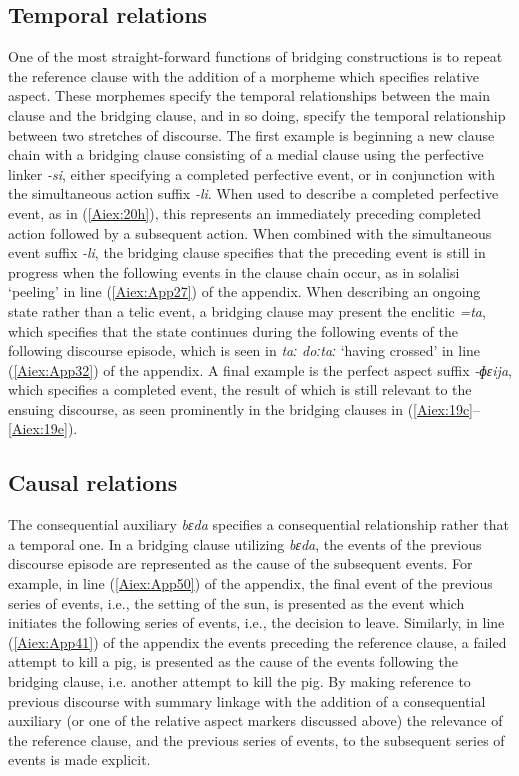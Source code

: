 \documentclass[output=paper]{LSP/langsci}
\begin{document}
\subsection{Temporal relations} 
\label{AiTemporal}
One of the most straight-forward functions of bridging constructions is to repeat the reference clause with the addition of a morpheme which specifies relative aspect. These morphemes specify the temporal relationships between the main clause and the bridging clause, and in so doing, specify the temporal relationship between two stretches of discourse. The first example is beginning a new clause chain with a bridging clause consisting of a medial clause using the perfective linker \textit{-si}, either specifying a completed perfective event, or in conjunction with the simultaneous action suffix \textit{-li}. When used to describe a completed perfective event, as in (\ref{Aiex:20h}), this represents an immediately preceding completed action followed by a subsequent action. When combined with the simultaneous event suffix \textit{-li}, the bridging clause specifies that the preceding event is still in progress when the following events in the clause chain occur, as in solalisi `peeling' in line (\ref{Aiex:App27}) of the appendix. When describing an ongoing state rather than a telic event, a bridging clause may present the enclitic \textit{=ta}, which specifies that the state continues during the following events of the following discourse episode, which is seen in \textit{taː doːtaː} `having crossed' in line (\ref{Aiex:App32}) of the appendix. A final example is the perfect aspect suffix \textit{-ɸɛija}, which specifies a completed event, the result of which is still relevant to the ensuing discourse, as seen prominently in the bridging clauses in (\ref{Aiex:19c}--\ref{Aiex:19e}).

\subsection{Causal relations} 
\label{AiCausal}
The consequential auxiliary \textit{bɛda} specifies a consequential relationship rather that a temporal one. In a bridging clause utilizing \textit{bɛda}, the events of the previous discourse episode are represented as the cause of the subsequent events. For example, in line (\ref{Aiex:App50}) of the appendix, the final event of the previous series of events, i.e., the setting of the sun, is presented as the event which initiates the following series of events, i.e., the decision to leave. Similarly, in line (\ref{Aiex:App41}) of the appendix the events preceding the reference clause, a failed attempt to kill a pig, is presented as the cause of the events following the bridging clause, i.e. another attempt to kill the pig. By making reference to previous discourse with summary linkage with the addition of a consequential auxiliary (or one of the relative aspect markers discussed above) the relevance of the reference clause, and the previous series of events, to the subsequent series of events is made explicit.
	
\end{document}
